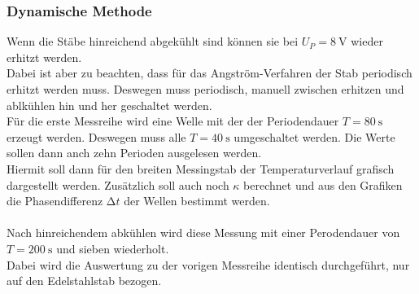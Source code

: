 \subsubsection{Dynamische Methode}
\noindent
Wenn die Stäbe hinreichend abgekühlt sind können sie bei $U_P=\SI{8}{\volt}$ wieder erhitzt werden.\\
Dabei ist aber zu beachten, dass für das Angström-Verfahren der Stab periodisch erhitzt werden muss.
Deswegen muss periodisch, manuell zwischen erhitzen und ablkühlen hin und her geschaltet werden.\\
Für die erste Messreihe wird eine Welle mit der der Periodendauer $T=\SI{80}{\second}$ erzeugt werden.
Deswegen muss alle $T=\SI{40}{\second}$ umgeschaltet werden. Die Werte sollen dann anch zehn Perioden ausgelesen werden.\\
Hiermit soll dann für den breiten Messingstab der Temperaturverlauf grafisch dargestellt werden. Zusätzlich soll auch noch $\kappa$ berechnet und aus den Grafiken die Phasendifferenz $\increment t$ der Wellen bestimmt werden.\\\\

Nach hinreichendem abkühlen wird diese Messung mit einer Perodendauer von $T=\SI{200}{\second}$ und sieben wiederholt.\\
Dabei wird die Auswertung zu der vorigen Messreihe identisch durchgeführt, nur auf den Edelstahlstab bezogen.
